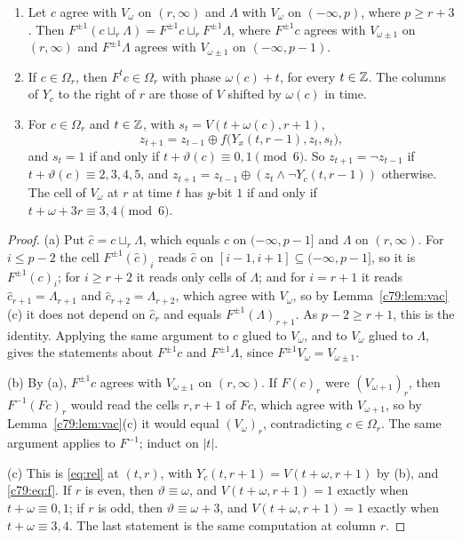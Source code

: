 \begin{lemma}\label{c79:lem:glue}
\begin{enumerate}
\item[(a)] Let $c$ agree with $V_\omega$ on $(r,\infty)$ and $\Lambda$ with $V_\omega$ on $(-\infty,p)$, where $p\ge r+3$. Then $F^{\pm1}(c\sqcup_r\Lambda)=F^{\pm1}c\sqcup_rF^{\pm1}\Lambda$, where $F^{\pm1}c$ agrees with $V_{\omega\pm1}$ on $(r,\infty)$ and $F^{\pm1}\Lambda$ agrees with $V_{\omega\pm1}$ on $(-\infty,p-1)$.
\item[(b)] If $c\in\Omega_r$, then $F^tc\in\Omega_r$ with phase $\omega(c)+t$, for every $t\in\mathbb{Z}$. The columns of $Y_c$ to the right of $r$ are those of $V$ shifted by $\omega(c)$ in time.
\item[(c)] For $c\in\Omega_r$ and $t\in\mathbb{Z}$, with $s_t=V(t+\omega(c),r+1)$,
\[
z_{t+1}=z_{t-1}\oplus f\bigl(Y_x(t,r-1),z_t,s_t\bigr),
\]
and $s_t=1$ if and only if $t+\vartheta(c)\equiv0,1\pmod 6$. So $z_{t+1}=\neg z_{t-1}$ if $t+\vartheta(c)\equiv2,3,4,5$, and $z_{t+1}=z_{t-1}\oplus(z_t\wedge\neg Y_c(t,r-1))$ otherwise. The cell of $V_\omega$ at $r$ at time $t$ has $y$-bit $1$ if and only if $t+\omega+3r\equiv3,4\pmod 6$.
\end{enumerate}
\end{lemma}

\begin{proof}
(a) Put $\hat c=c\sqcup_r\Lambda$, which equals $c$ on $(-\infty,p-1]$ and $\Lambda$ on $(r,\infty)$. For $i\le p-2$ the cell $F^{\pm1}({\hat c})_i$ reads $\hat c$ on $[i-1,i+1]\subseteq(-\infty,p-1]$, so it is $F^{\pm1}(c)_i$; for $i\ge r+2$ it reads only cells of $\Lambda$; and for $i=r+1$ it reads ${\hat c}_{r+1}=\Lambda_{r+1}$ and ${\hat c}_{r+2}=\Lambda_{r+2}$, which agree with $V_\omega$, so by Lemma~\ref{c79:lem:vac}(c) it does not depend on ${\hat c}_r$ and equals $F^{\pm1}(\Lambda)_{r+1}$. As $p-2\ge r+1$, this is the identity. Applying the same argument to $c$ glued to $V_\omega$, and to $V_\omega$ glued to $\Lambda$, gives the statements about $F^{\pm1}c$ and $F^{\pm1}\Lambda$, since $F^{\pm1}V_\omega=V_{\omega\pm1}$.

(b) By (a), $F^{\pm1}c$ agrees with $V_{\omega\pm1}$ on $(r,\infty)$. If $F(c)_r$ were $(V_{\omega+1})_r$, then $F^{-1}(Fc)_r$ would read the cells $r,r+1$ of $Fc$, which agree with $V_{\omega+1}$, so by Lemma~\ref{c79:lem:vac}(c) it would equal $(V_\omega)_r$, contradicting $c\in\Omega_r$. The same argument applies to $F^{-1}$; induct on $|t|$.

(c) This is \eqref{eq:rel} at $(t,r)$, with $Y_c(t,r+1)=V(t+\omega,r+1)$ by (b), and \eqref{c79:eq:f}. If $r$ is even, then $\vartheta\equiv\omega$, and $V(t+\omega,r+1)=1$ exactly when $t+\omega\equiv0,1$; if $r$ is odd, then $\vartheta\equiv\omega+3$, and $V(t+\omega,r+1)=1$ exactly when $t+\omega\equiv3,4$. The last statement is the same computation at column $r$.
\end{proof}

